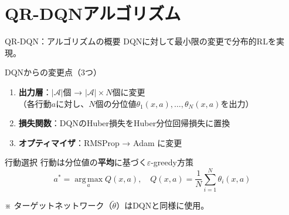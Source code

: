 \documentclass[aspectratio=169, dvipdfmx, 11pt]{beamer}
\begin{document}
\section{QR-DQNアルゴリズム}

\begin{frame}{QR-DQN：アルゴリズムの概要}
  DQNに対して最小限の変更で分布的RLを実現。
  \vspace{-5pt}

  \begin{block}{DQNからの変更点（3つ）}
    {\small
    \begin{enumerate}\setlength{\itemsep}{0pt}
      \item \textbf{出力層}：$|\mathcal{A}|$個 → $|\mathcal{A}| \times N$個に変更\\
        {\scriptsize （各行動$a$に対し、$N$個の分位値$\theta_1(x,a), \dots, \theta_N(x,a)$を出力）}
      \item \textbf{損失関数}：DQNのHuber損失を\alert{Huber分位回帰損失}に置換
      \item \textbf{オプティマイザ}：RMSProp → Adam に変更
    \end{enumerate}
    }
  \end{block}
  \begin{exampleblock}{行動選択}
    {\small 行動は分位値の\textbf{平均}に基づく$\varepsilon$-greedy方策}
    {\small
    \vspace{-4pt}
    \[
      a^* = \operatorname*{arg\,max}_a Q(x, a), \quad Q(x, a) = \frac{1}{N}\sum_{i=1}^{N} \theta_i(x,a)
    \]
    \vspace{-4pt}
    }
  \end{exampleblock}
  {\scriptsize ※ ターゲットネットワーク（$\tilde{\theta}$）はDQNと同様に使用。}
\end{frame}
\end{document}
